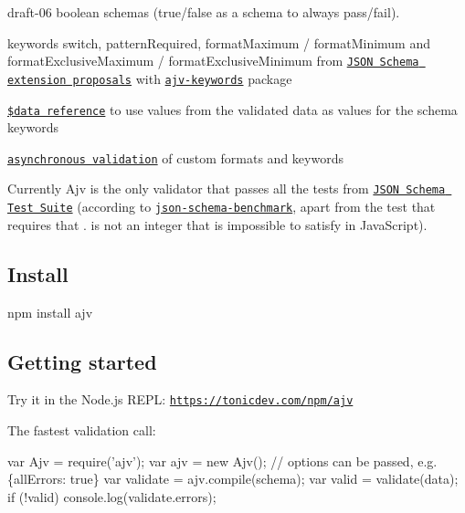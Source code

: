 \begin{DoxyItemize}
\item draft-\/06 boolean schemas ({\ttfamily true}/{\ttfamily false} as a schema to always pass/fail).
\item keywords {\ttfamily switch}, {\ttfamily pattern\+Required}, {\ttfamily format\+Maximum} / {\ttfamily format\+Minimum} and {\ttfamily format\+Exclusive\+Maximum} / {\ttfamily format\+Exclusive\+Minimum} from \href{https://github.com/json-schema/json-schema/wiki/v5-Proposals}{\tt J\+S\+ON Schema extension proposals} with \href{https://github.com/epoberezkin/ajv-keywords}{\tt ajv-\/keywords} package
\item \href{#data-reference}{\tt \$data reference} to use values from the validated data as values for the schema keywords
\item \href{#asynchronous-validation}{\tt asynchronous validation} of custom formats and keywords
\end{DoxyItemize}

Currently Ajv is the only validator that passes all the tests from \href{https://github.com/json-schema/JSON-Schema-Test-Suite}{\tt J\+S\+ON Schema Test Suite} (according to \href{https://github.com/ebdrup/json-schema-benchmark}{\tt json-\/schema-\/benchmark}, apart from the test that requires that {.} is not an integer that is impossible to satisfy in Java\+Script).

\subsection*{Install}


\begin{DoxyCode}
npm install ajv
\end{DoxyCode}


\subsection*{\label{_usage}%
Getting started}

Try it in the Node.\+js R\+E\+PL\+: \href{https://tonicdev.com/npm/ajv}{\tt https\+://tonicdev.\+com/npm/ajv}

The fastest validation call\+:


\begin{DoxyCode}
var Ajv = require('ajv');
var ajv = new Ajv(); // options can be passed, e.g. \{allErrors: true\}
var validate = ajv.compile(schema);
var valid = validate(data);
if (!valid) console.log(validate.errors);
\end{DoxyCode}


